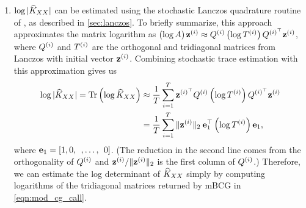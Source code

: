 \begin{enumerate}
  \item $\log \vert \widehat{K}_{XX} \vert$
    can be estimated using the stochastic Lanczos quadrature routine of \citet{ubaru2017fast}, as described in \cref{sec:lanczos}.
    To briefly summarize, this approach approximates the matrix logarithm as $\left( \log A \right) \mathbf{z}^{(i)} \approx Q^{(i)} \left( \log T^{(i)} \right) Q^{(i)^\top} \mathbf{z}^{(i)}$,
    where $Q^{(i)}$ and $T^{(i)}$ are the orthogonal and tridiagonal matrices from Lanczos with initial vector $\mathbf{z}^{(i)}$.
    Combining stochastic trace estimation with this approximation gives us
    \begin{align*}
      \log \vert \trainK \vert = \tr{ \log \trainK }
      &\approx \frac{1}{T} \sum_{i=1}^T \bz^{(i)^\top} \bQ^{(i)} \left( \log \bT^{(i)} \right) \bQ^{(i)^\top} \bz^{(i)}
      \\
      &= \frac{1}{T} \sum_{i=1}^T \Vert \bz^{(i)} \Vert_2 \: \be_1^\top \left( \log \bT^{(i)} \right) \be_1,
    \end{align*}
    where $\mathbf{e}_1 = [1, 0, \:\:, \ldots, \:\: 0]$.
    (The reduction in the second line comes from the orthogonality of $Q^{(i)}$ and $\mathbf{z}^{(i)} / \Vert \mathbf{z}^{(i)} \Vert_2$ is the first column of $Q^{(i)}$.)
    Therefore, we can estimate the log determinant of $\widehat{K}_{XX}$ simply by computing logarithms of the tridiagonal matrices returned by mBCG in \cref{eqn:mod_cg_call}.

\end{enumerate}
